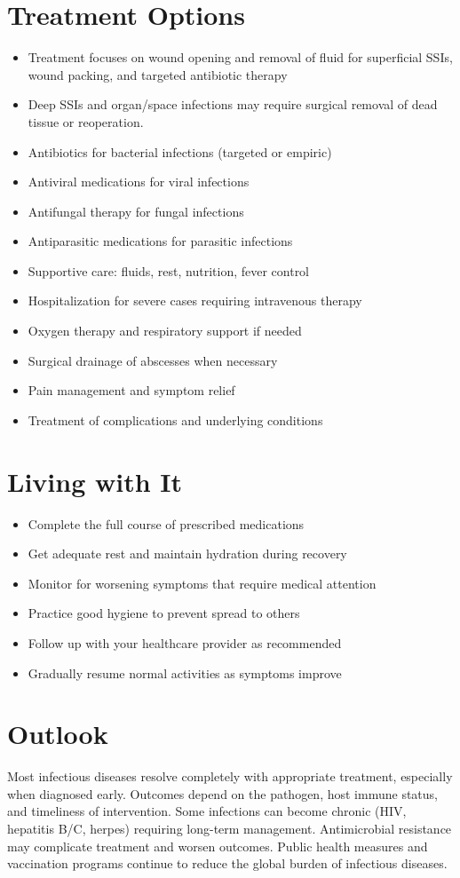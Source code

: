 \section{Treatment Options}
\begin{itemize}[noitemsep]
  \item Treatment focuses on wound opening and removal of fluid for superficial SSIs, wound packing, and targeted antibiotic therapy
  \item Deep SSIs and organ/space infections may require surgical removal of dead tissue or reoperation.
  \item Antibiotics for bacterial infections (targeted or empiric)
  \item Antiviral medications for viral infections
  \item Antifungal therapy for fungal infections
  \item Antiparasitic medications for parasitic infections
  \item Supportive care: fluids, rest, nutrition, fever control
  \item Hospitalization for severe cases requiring intravenous therapy
  \item Oxygen therapy and respiratory support if needed
  \item Surgical drainage of abscesses when necessary
  \item Pain management and symptom relief
  \item Treatment of complications and underlying conditions
\end{itemize}
\section{Living with It}
\begin{itemize}[noitemsep]
  \item Complete the full course of prescribed medications
  \item Get adequate rest and maintain hydration during recovery
  \item Monitor for worsening symptoms that require medical attention
  \item Practice good hygiene to prevent spread to others
  \item Follow up with your healthcare provider as recommended
  \item Gradually resume normal activities as symptoms improve
\end{itemize}
\section{Outlook}
Most infectious diseases resolve completely with appropriate treatment, especially when diagnosed early. Outcomes depend on the pathogen, host immune status, and timeliness of intervention. Some infections can become chronic (HIV, hepatitis B/C, herpes) requiring long-term management. Antimicrobial resistance may complicate treatment and worsen outcomes. Public health measures and vaccination programs continue to reduce the global burden of infectious diseases.
